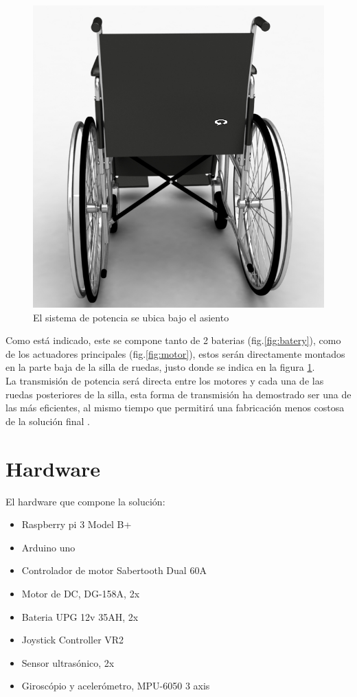 \begin{figure}
    \centering
    \includegraphics[width=.5\textwidth]{Figures/wheel_back.png}
    \decoRule
    \caption{El sistema de potencia se ubica bajo el asiento}
    \label{fig:back}
\end{figure}
Como est\'a indicado, este se compone tanto de 2 baterias
(fig.\ref{fig:batery}), como de los actuadores principales
(fig.\ref{fig:motor}), estos ser\'an directamente montados en la parte baja de
la silla de ruedas, justo donde se indica en la figura \ref{fig:back}.\\
La transmisi\'on de potencia ser\'a directa entre los motores y cada una de las
ruedas posteriores de la silla, esta forma de transmisi\'on ha demostrado ser
una de las m\'as eficientes, al mismo tiempo que permitir\'a una fabricaci\'on
menos costosa de la soluci\'on final \parencite{motorized}.


\section{Hardware}


El hardware que compone la soluci\'on:
\begin{itemize}
    \item Raspberry pi 3 Model B+
    \item Arduino uno
    \item Controlador de motor Sabertooth Dual 60A
    \item Motor de DC, DG-158A, 2x
    \item Bateria UPG 12v 35AH, 2x
    \item Joystick Controller VR2
    \item Sensor ultras\'onico, 2x
    \item Girosc\'opio y aceler\'ometro, MPU-6050 3 axis

\end{itemize}

